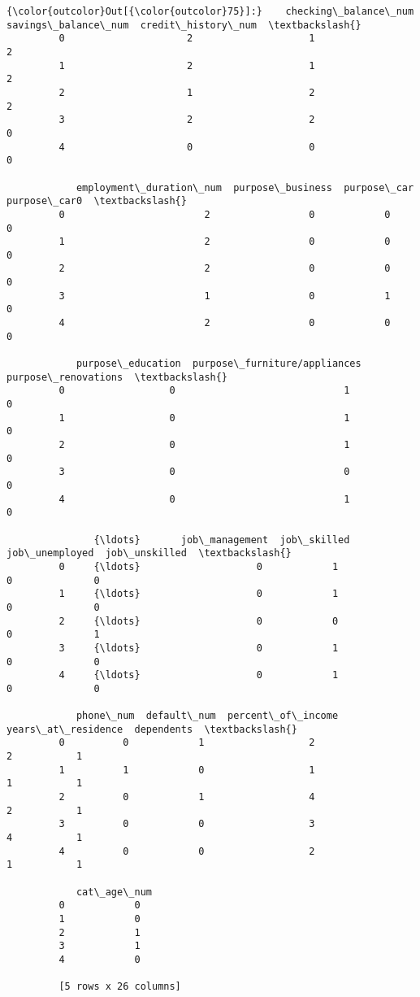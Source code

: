 \documentclass[11pt]{article}
\begin{document}
\begin{Verbatim}[commandchars=\\\{\}]
{\color{outcolor}Out[{\color{outcolor}75}]:}    checking\_balance\_num  savings\_balance\_num  credit\_history\_num  \textbackslash{}
         0                     2                    1                   2   
         1                     2                    1                   2   
         2                     1                    2                   2   
         3                     2                    2                   0   
         4                     0                    0                   0   
         
            employment\_duration\_num  purpose\_business  purpose\_car  purpose\_car0  \textbackslash{}
         0                        2                 0            0             0   
         1                        2                 0            0             0   
         2                        2                 0            0             0   
         3                        1                 0            1             0   
         4                        2                 0            0             0   
         
            purpose\_education  purpose\_furniture/appliances  purpose\_renovations  \textbackslash{}
         0                  0                             1                    0   
         1                  0                             1                    0   
         2                  0                             1                    0   
         3                  0                             0                    0   
         4                  0                             1                    0   
         
               {\ldots}       job\_management  job\_skilled  job\_unemployed  job\_unskilled  \textbackslash{}
         0     {\ldots}                    0            1               0              0   
         1     {\ldots}                    0            1               0              0   
         2     {\ldots}                    0            0               0              1   
         3     {\ldots}                    0            1               0              0   
         4     {\ldots}                    0            1               0              0   
         
            phone\_num  default\_num  percent\_of\_income  years\_at\_residence  dependents  \textbackslash{}
         0          0            1                  2                   2           1   
         1          1            0                  1                   1           1   
         2          0            1                  4                   2           1   
         3          0            0                  3                   4           1   
         4          0            0                  2                   1           1   
         
            cat\_age\_num  
         0            0  
         1            0  
         2            1  
         3            1  
         4            0  
         
         [5 rows x 26 columns]
\end{Verbatim}
\end{document}
